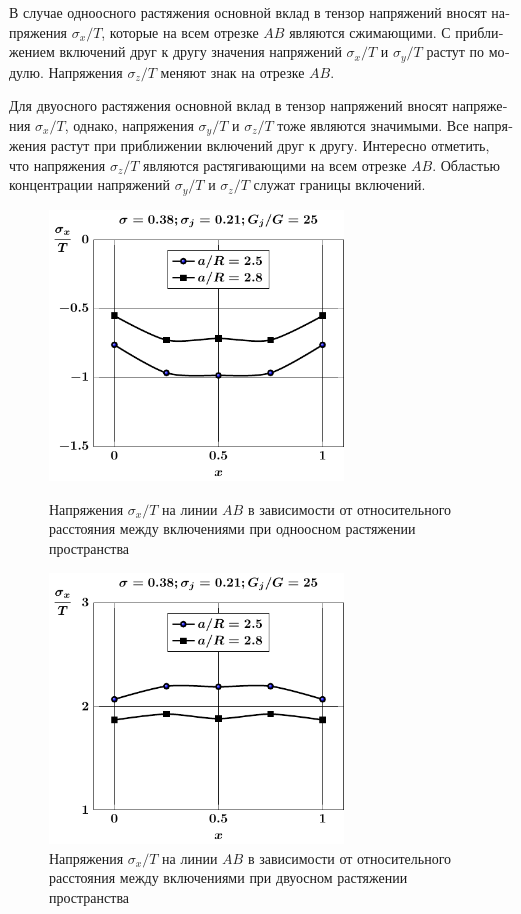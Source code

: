 \begin{russian}
В случае одноосного растяжения основной вклад в тензор напряжений вносят напряжения $\sigma_x/T$, которые на всем отрезке $AB$ являются сжимающими. С приближением включений друг к другу значения напряжений $\sigma_x/T$ и $\sigma_y/T$ растут по модулю. Напряжения $\sigma_z/T$ меняют знак на отрезке $AB$.

Для двуосного растяжения основной вклад в тензор напряжений вносят напряжения $\sigma_x/T$, однако, напряжения $\sigma_y/T$ и $\sigma_z/T$ тоже являются значимыми. Все напряжения растут при приближении включений друг к другу. Интересно отметить, что напряжения $\sigma_z/T$ являются растягивающими на всем отрезке $AB$. Областью концентрации напряжений $\sigma_y/T$ и $\sigma_z/T$ служат границы включений.

\begin{figure}[h!]
\centering\footnotesize
\parbox[b]{7.5cm}{\centering\includegraphics[width=7.8cm]{inc9-a-d95-g25-t1-sig_x.pdf}
\caption{Напряжения $\sigma_x/T$ на линии  $AB$ в зависимости от относительного расстояния между включениями при одноосном растяжении пространства
\label{f:8:64}}}\hfil\hfil
\parbox[b]{7.5cm}{\centering\includegraphics[width=7.8cm]{inc9-a-d95-g25-t2-sig_x.pdf}
\caption{Напряжения $\sigma_x/T$ на линии  $AB$ в зависимости от относительного расстояния между включениями при двуосном растяжении пространства
\label{f:8:65}}}
\end{figure}


\end{russian}
